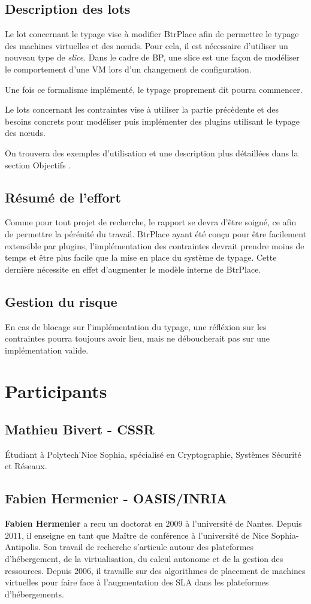 \documentclass[a4paper]{article}
\begin{document}
\subsection{Description des lots}
Le lot concernant le typage vise à modifier BtrPlace afin de permettre le typage
des machines virtuelles et des nœuds. Pour cela, il est nécessaire d'utiliser un
nouveau type de \textit{slice}. Dans le cadre de BP, une slice est une façon
de modéliser le comportement d'une VM lors d'un changement de configuration.

Une fois ce formalisme implémenté, le typage proprement dit pourra commencer.

Le lots concernant les contraintes vise à utiliser la partie précèdente et
des besoins concrets pour modéliser puis implémenter des plugins utilisant
le typage des nœuds.

On trouvera des exemples d'utilisation et une description plus détaillées
dans la section \og Objectifs \fg.

\subsection{Résumé de l'effort}
Comme pour tout projet de recherche, le rapport se devra d'être soigné, ce afin
de permettre la pérénité du travail. BtrPlace ayant été conçu pour être
facilement extensible par plugins, l'implémentation des contraintes devrait
prendre moins de temps et être plus facile que la mise en place du système de
typage. Cette dernière nécessite en effet d'augmenter le modèle interne de
BtrPlace.

\subsection{Gestion du risque}
En cas de blocage sur l'implémentation du typage, une réfléxion sur
les contraintes pourra toujours avoir lieu, mais ne déboucherait pas
sur une implémentation valide.
\section{Participants}
\subsection{Mathieu Bivert - CSSR}
Étudiant à Polytech'Nice Sophia, spécialisé en Cryptographie, Systèmes
Sécurité et Réseaux.

\subsection{Fabien Hermenier - OASIS/INRIA}
\textbf{Fabien Hermenier} a recu un doctorat en $2009$ à l'université
de Nantes. Depuis $2011$, il enseigne en tant que Maître de conférence
à l'université de Nice Sophia-Antipolis. Son travail de recherche
s'articule autour des plateformes d'hébergement, de la virtualisation,
du calcul autonome et de la gestion des ressources. Depuis $2006$, il
travaille sur des algorithmes de placement de machines virtuelles pour
faire face à l'augmentation des SLA dans les plateformes d'hébergements.

\newpage
{}


\end{document}
